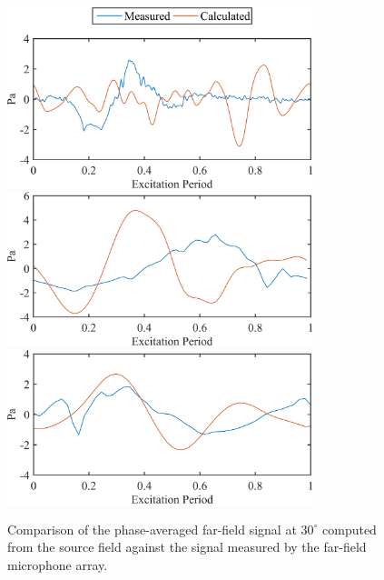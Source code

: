 \begin{figure}
	\centering
		\includegraphics[width=3.5in]{Figures/ch5_St005_FF_v2.png}\\
		\includegraphics[width=3.5in]{Figures/ch5_St025_FF_v3.png}\\
		\includegraphics[width=3.5in]{Figures/ch5_St035_FF_v3.png}
	\caption{Comparison of the phase-averaged far-field signal at $30^\circ$ computed from the source field against the signal measured by the far-field microphone array.}
	\label{fig:ch5_farfield}
\end{figure}

